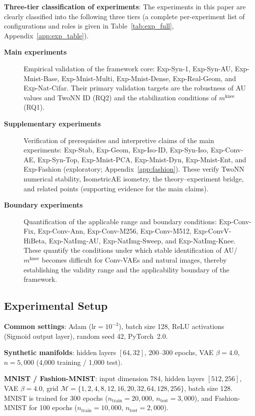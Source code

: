 \documentclass[make,article,submit,pdftex,moreauthors]{Definitions/mdpi}
\newcommand{\mknee}{m^{\mathrm{knee}}}
\begin{document}
\textbf{Three-tier classification of experiments}:
The experiments in this paper are clearly classified into the following three tiers
(a complete per-experiment list of configurations and roles is given in
Table~\ref{tab:exp_full}, Appendix~\ref{app:exp_table}).
\begin{description}
  \item[\textbf{Main experiments}]
        Empirical validation of the framework core:
        Exp-Syn-1, Exp-Syn-AU, Exp-Mnist-Base, Exp-Mnist-Multi, Exp-Mnist-Dense, Exp-Real-Geom, and Exp-Nat-Cifar.
        Their primary validation targets are the robustness of AU values and TwoNN ID (RQ2) and the stabilization conditions of $\mknee$ (RQ1).
  \item[\textbf{Supplementary experiments}]
        Verification of prerequisites and interpretive claims of the main experiments:
        Exp-Stab, Exp-Geom, Exp-Iso-ID, Exp-Syn-Iso, Exp-Conv-AE, Exp-Syn-Top, Exp-Mnist-PCA, Exp-Mnist-Dyn, Exp-Mnist-Ent,
        and Exp-Fashion (exploratory; Appendix~\ref{app:fashion}).
        These verify TwoNN numerical stability, IsometricAE isometry, the theory--experiment bridge, and related points (supporting evidence for the main claims).
  \item[\textbf{Boundary experiments}]
        Quantification of the applicable range and boundary conditions:
        Exp-Conv-Fix, Exp-Conv-Ann, Exp-Conv-M256, Exp-Conv-M512, Exp-ConvV-HiBeta, Exp-NatImg-AU, Exp-NatImg-Sweep, and Exp-NatImg-Knee.
        These quantify the conditions under which stable identification of AU/$\mknee$ becomes difficult for Conv-VAEs and natural images,
        thereby establishing the validity range and the applicability boundary of the framework.
\end{description}

\subsection{Experimental Setup}\label{sec:exp_setup}

\textbf{Common settings}: Adam ($\mathrm{lr} = 10^{-3}$), batch size 128, ReLU activations (Sigmoid output layer), random seed 42, PyTorch~2.0.

\textbf{Synthetic manifolds}: hidden layers $[64, 32]$, 200--300 epochs, VAE $\beta = 4.0$, $n = 5{,}000$ (4,000 training / 1,000 test).

\textbf{MNIST / Fashion-MNIST}: input dimension 784, hidden layers $[512, 256]$, VAE $\beta = 4.0$,
grid $\mathcal{M} = \{1,2,4,8,12,16,20,32,64,128,256\}$, batch size 128.
MNIST is trained for 300 epochs ($n_{\mathrm{train}} = 20{,}000$, $n_{\mathrm{test}} = 3{,}000$),
and Fashion-MNIST for 100 epochs ($n_{\mathrm{train}} = 10{,}000$, $n_{\mathrm{test}} = 2{,}000$).
\end{document}
